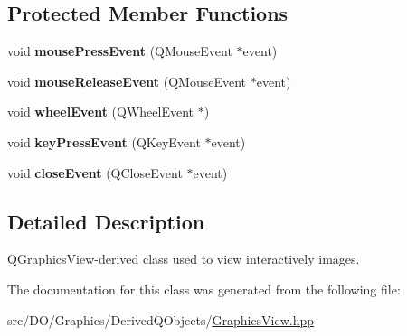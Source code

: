 \subsection*{Protected Member Functions}
\begin{DoxyCompactItemize}
\item 
\hypertarget{class_d_o_1_1_graphics_view_ad2272e344e46519f026cd02f419884f1}{void {\bfseries mouse\-Press\-Event} (Q\-Mouse\-Event $\ast$event)}\label{class_d_o_1_1_graphics_view_ad2272e344e46519f026cd02f419884f1}

\item 
\hypertarget{class_d_o_1_1_graphics_view_a35226f6549add1ff837c65888fcd00fc}{void {\bfseries mouse\-Release\-Event} (Q\-Mouse\-Event $\ast$event)}\label{class_d_o_1_1_graphics_view_a35226f6549add1ff837c65888fcd00fc}

\item 
\hypertarget{class_d_o_1_1_graphics_view_abc61c05ed30a94d66ab715c718532c03}{void {\bfseries wheel\-Event} (Q\-Wheel\-Event $\ast$)}\label{class_d_o_1_1_graphics_view_abc61c05ed30a94d66ab715c718532c03}

\item 
\hypertarget{class_d_o_1_1_graphics_view_adf2e9d5e456a754a5459e8435b0b094b}{void {\bfseries key\-Press\-Event} (Q\-Key\-Event $\ast$event)}\label{class_d_o_1_1_graphics_view_adf2e9d5e456a754a5459e8435b0b094b}

\item 
\hypertarget{class_d_o_1_1_graphics_view_a5de2bd09256045c0b96e5a0be780fa85}{void {\bfseries close\-Event} (Q\-Close\-Event $\ast$event)}\label{class_d_o_1_1_graphics_view_a5de2bd09256045c0b96e5a0be780fa85}

\end{DoxyCompactItemize}


\subsection{Detailed Description}
Q\-Graphics\-View-\/derived class used to view interactively images. 

The documentation for this class was generated from the following file\-:\begin{DoxyCompactItemize}
\item 
src/\-D\-O/\-Graphics/\-Derived\-Q\-Objects/\hyperlink{_graphics_view_8hpp}{Graphics\-View.\-hpp}\end{DoxyCompactItemize}
